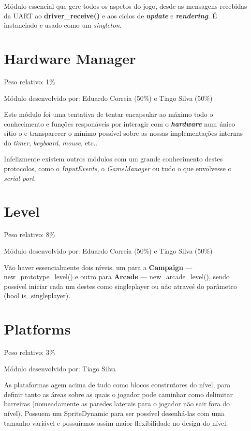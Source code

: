 \documentclass{report}
\begin{document}
Módulo essencial que gere todos os aspetos do jogo, desde as mensagens recebidas da UART ao \textbf{driver\_receive()} e aos ciclos de \textbf{\textit{update}} e \textbf{\textit{rendering}}. É instanciado e usado como um \textit{singleton}.

\section{Hardware Manager}

Peso relativo: 1\%

Módulo desenvolvido por: Eduardo Correia (50\%) e Tiago Silva (50\%)
\newline

Este módulo foi uma tentativa de tentar encapsular ao máximo todo o conhecimento e funções responáveis por interagir com o \textbf{\textit{hardware}} num único sítio o e transparecer o mínimo possível sobre as nossas implementações internas do \textit{timer}, \textit{keyboard}, \textit{mouse}, etc..

Infelizmente existem outros módulos com um grande conhecimento destes protocolos, como o \textit{InputEvents}, o \textit{GameManager} ou tudo o que envolvesse o \textit{serial port}.

\section{Level}

Peso relativo: 8\%

Módulo desenvolvido por: Eduardo Correia (50\%) e Tiago Silva (50\%) 
\newline

Vão haver essencialmente dois níveis, um para a \textbf{Campaign} --- new\_prototype\_level() e outro para \textbf{Arcade} --- new\_arcade\_level(), sendo possível iniciar cada um destes como singleplayer ou não atraveś do parâmetro (bool is\_singleplayer).

\section{Platforms}

Peso relativo: 3\%

Módulo desenvolvido por: Tiago Silva
\newline

As plataformas agem acima de tudo como blocos construtores do nível, para definir tanto as áreas sobre as quais o jogador pode caminhar como delimitar barreiras (nomeadamente as paredes laterais para o jogador não sair fora do nível).
Possuem um SpriteDynamic para ser possível desenhá-las com uma tamanho variável e possuírmos assim maior flexibilidade no design do nível.
\end{document}
